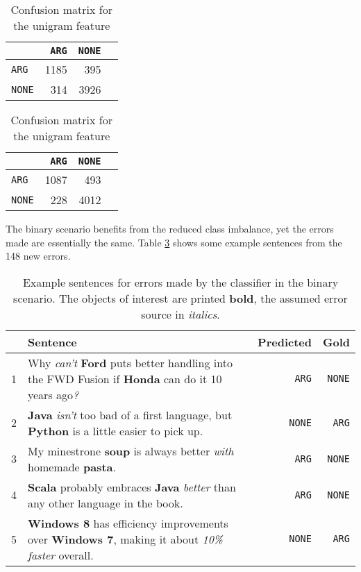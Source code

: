 \begin{table}[h]
    \begin{minipage}{.5\linewidth}
    \centering
   \caption{Confusion matrix for the sentence embedding feature} 
    \label{tbl:2_conf_inf}

\begin{tabular}{@{}lrrr@{}}
\toprule
       & \texttt{ARG}  & \texttt{NONE} \\ \midrule
\texttt{ARG} & 1185      &   395   \\
\texttt{NONE}   & 314          &  3926    \\ \bottomrule
\end{tabular}

  \end{minipage} \hfill
    \begin{minipage}{.5\linewidth}
   \centering
     \caption{Confusion matrix for the unigram feature} 
       \label{tbl:2_conf_uni}

\begin{tabular}{@{}lrrr@{}}
\toprule
       & \texttt{ARG}  & \texttt{NONE} \\ \midrule
\texttt{ARG} & 1087      &   493   \\
\texttt{NONE}   & 228          &  4012    \\ \bottomrule
\end{tabular}

    \end{minipage} 
\end{table}

The binary scenario benefits from the reduced class imbalance, yet the errors made are essentially the same. Table \ref{tbl:2_mistakes} shows some example sentences from the 148 new errors.

\begin{table}[h]
\caption{Example sentences for errors made by the classifier in the binary scenario. The objects of interest are printed \textbf{bold}, the assumed error source in \emph{italics}.}
\label{tbl:2_mistakes}
\begin{tabularx}{\linewidth}{lXrr}
\toprule
 & Sentence & Predicted & Gold \\ \midrule
1 & Why \emph{can't} \textbf{Ford} puts better handling into the FWD Fusion if \textbf{Honda} can do it 10 years ago\emph{?} & \texttt{ARG} & \texttt{NONE}\\
2 & \textbf{Java} \emph{isn't} too bad of a first language, but \textbf{Python} is a little easier to pick up. & \texttt{NONE} & \texttt{ARG} \\
3 & My minestrone \textbf{soup} is always better \emph{with} homemade \textbf{pasta}. & \texttt{ARG} & \texttt{NONE} \\
4 & \textbf{Scala} probably embraces \textbf{Java} \emph{better} than any other language in the book. & \texttt{ARG} & \texttt{NONE} \\
5 & \textbf{Windows 8} has efficiency improvements over \textbf{Windows 7}, making it about \emph{10\% faster} overall. & \texttt{NONE} & \texttt{ARG} \\
\bottomrule
\end{tabularx}

\end{table}

